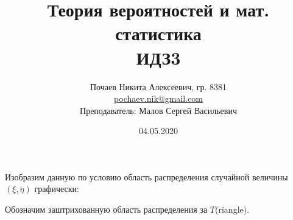 

\title{Теория вероятностей и мат. статистика \\ ИДЗ3}
\date{04.05.2020}
\author{Почаев Никита Алексеевич, гр. 8381 \\ \href{mailto:pochaev.nik@gmail.com}{pochaev.nik@gmail.com} \\ Преподаватель: Малов Сергей Васильевич}


	
\renewcommand{\figurename}{Рисунок}

\maketitle

\begin{figure}[H]
\end{figure}

Изобразим данную по условию область распределения случайной величины $(\xi, \eta)$ графически:
\begin{figure}[H]
\end{figure}
Обозначим заштрихованную область распределения за $T$(riangle).

